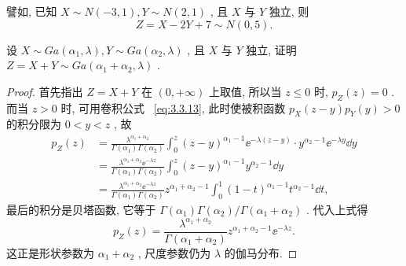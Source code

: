    譬如, 已知 $X\sim N(-3,1),Y\sim N(2,1)$ , 且 $X$ 与 $Y$ 独立, 则
   \begin{equation*}
   	Z=X-2Y+7\sim N(0,5).
   \end{equation*}
   \begin{example}[(伽玛分布的可加性)]\label{exam:3.3.7}
   	设 $X\sim Ga(\alpha_1,\lambda),Y\sim Ga(\alpha_2,\lambda)$ , 且 $X$ 与 $Y$ 独立, 证明 $Z=X+Y\sim Ga(\alpha_1+\alpha_2,\lambda)$ .
   	\begin{proof}
   		首先指出 $Z=X+Y$ 在 $(0,+\infty)$ 上取值, 所以当 $z\leqslant0$ 时, $p_{Z}(z)=0$ . 而当 $z>0$ 时, 可用卷积公式~ \eqref{eq:3.3.13}, 此时使被积函数 $p_{X}(z-y)p_{Y}(y)>0$ 的积分限为 $0<y<z$ , 故
   		\begin{align*}
   			p_{Z}(z)&=\frac{\lambda^{\alpha_1+\alpha_2}}{\Gamma(\alpha_1)\Gamma(\alpha_2)}\int_{0}^{z}(z-y)^{\alpha_1-1}\ee^{-\lambda(z-y)}\cdot y^{\alpha_2-1}\ee^{-\lambda y}\dd y\\
   			&=\frac{\lambda^{\alpha_1+\alpha_2}\ee^{-\lambda z}}{\Gamma(\alpha_1)\Gamma(\alpha_2)}\int_{0}^{z}(z-y)^{\alpha_1-1}y^{\alpha_2-1}\dd y\\
   			&=\frac{\lambda^{\alpha_1+\alpha_2}\ee^{-\lambda z}}{\Gamma(\alpha_1)\Gamma(\alpha_2)}z^{\alpha_1+\alpha_2-1}\int_{0}^{1}(1-t)^{\alpha_1-1}t^{\alpha_2-1}\dd t,
   		\end{align*}
   		最后的积分是贝塔函数, 它等于 $\Gamma(\alpha_1)\Gamma(\alpha_2)/\Gamma(\alpha_1+\alpha_2)$ . 代入上式得
   		\begin{equation*}
   			p_{Z}(z)=\frac{\lambda^{\alpha_1+\alpha_2}}{\Gamma(\alpha_1+\alpha_2)}z^{\alpha_1+\alpha_2-1}\ee^{-\lambda z}.
   		\end{equation*}
   		这正是形状参数为 $\alpha_1+\alpha_2$ , 尺度参数仍为 $\lambda$ 的伽马分布.
   		

\end{proof}
\end{example}

